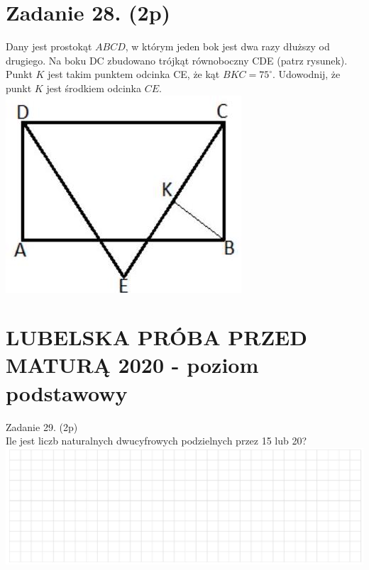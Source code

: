 \documentclass[10pt]{article}
\begin{document}
\section*{Zadanie 28. (2p)}
Dany jest prostokąt \(A B C D\), w którym jeden bok jest dwa razy dłuższy od drugiego. Na boku DC zbudowano trójkąt równoboczny CDE (patrz rysunek). Punkt \(K\) jest takim punktem odcinka CE, że kąt \(B K C=75^{\circ}\). Udowodnij, że punkt \(K\) jest środkiem odcinka \(C E\).\\
\includegraphics[max width=\textwidth, center]{2024_11_21_c2f4637e26cc7e4291d3g-09}

\section*{LUBELSKA PRÓBA PRZED MATURĄ 2020 - poziom podstawowy}
Zadanie 29. (2p)\\
Ile jest liczb naturalnych dwucyfrowych podzielnych przez 15 lub 20?\\
\includegraphics[max width=\textwidth, center]{2024_11_21_c2f4637e26cc7e4291d3g-10(1)}
\end{document}
